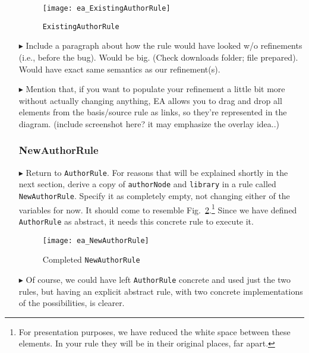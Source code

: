 \begin{itemize}
\begin{figure}[htbp]
\begin{center}
  \texttt{[image: ea\_ExistingAuthorRule]}
  \caption{\texttt{ExistingAuthorRule}}
  \label{ea:existingAuthorRule}
\end{center}
\end{figure}

\item[$\blacktriangleright$] \update Include a paragraph about how the rule would have looked w/o refinements (i.e., before the bug). Would be big. (Check
downloads folder; file prepared). Would have exact same semantics as our refinement(s).

\item[$\blacktriangleright$] Mention that, if you want to populate your refinement a little bit more without actually changing anything, EA allows you to drag
and drop all elements from the basis/source rule as links, so they're represented in the diagram. (include screenshot here? it may emphasize the overlay idea..)

\subsubsection{NewAuthorRule} %

\item[$\blacktriangleright$] Return to \texttt{AuthorRule}. For reasons that will be explained shortly in the next section, derive a copy of \texttt{authorNode}
and \texttt{library} in a rule called \texttt{NewAuthorRule}. Specify it as completely empty, not changing either of the variables for now. It should come to
resemble Fig.~\ref{ea:NewAuthorRule}.\footnote{For presentation purposes, we have reduced the white space between these elements. In your rule they
will be in their original places, far apart.} Since we have defined \texttt{AuthorRule} as abstract, it needs this concrete rule to execute it. 

\vspace{0.5cm}

\begin{figure}[htbp]
\begin{center}
  \texttt{[image: ea\_NewAuthorRule]}
  \caption{Completed \texttt{NewAuthorRule}}
  \label{ea:NewAuthorRule}
\end{center}
\end{figure}

\item[$\blacktriangleright$] Of course, we could have left \texttt{AuthorRule} concrete and used just the two rules, but having an explicit abstract rule, with
two concrete implementations of the possibilities, is clearer.


\end{itemize}
